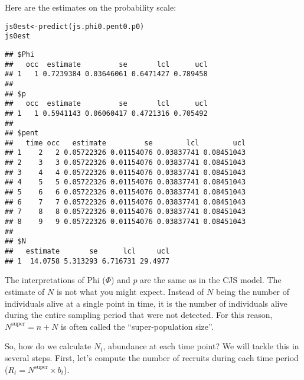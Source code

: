 \documentclass[12pt]{article}\usepackage[]{graphicx}\usepackage[]{color}
\makeatletter
\newcommand{\hlstd}[1]{\textcolor[rgb]{0,0,0}{#1}}%
\newcommand{\hlkwb}[1]{\textcolor[rgb]{0,0.341,0.682}{#1}}%
\newcommand{\hlkwd}[1]{\textcolor[rgb]{0.004,0.004,0.506}{#1}}%
\newenvironment{kframe}{%
 \def\at@end@of@kframe{}%
 \ifinner\ifhmode%
  \def\at@end@of@kframe{\end{minipage}}%
  \begin{minipage}{\columnwidth}%
 \fi\fi%
 \def\FrameCommand##1{\hskip\@totalleftmargin \hskip-\fboxsep
 \colorbox{shadecolor}{##1}\hskip-\fboxsep
     \hskip-\linewidth \hskip-\@totalleftmargin \hskip\columnwidth}%
 \MakeFramed {\advance\hsize-\width
   \@totalleftmargin\z@ \linewidth\hsize
   \@setminipage}}%
 {\par\unskip\endMakeFramed%
 \at@end@of@kframe}
\newenvironment{knitrout}{}{} %
\makeatother
\begin{document}
Here are the estimates on the probability scale:


\begin{knitrout}\small
{}\color{fgcolor}\begin{kframe}
\begin{alltt}
\hlstd{js0est} \hlkwb{<-} \hlkwd{predict}\hlstd{(js.phi0.pent0.p0)}
\hlstd{js0est}
\end{alltt}
\begin{verbatim}
## $Phi
##   occ  estimate         se       lcl      ucl
## 1   1 0.7239384 0.03646061 0.6471427 0.789458
## 
## $p
##   occ  estimate         se       lcl      ucl
## 1   1 0.5941143 0.06060417 0.4721316 0.705492
## 
## $pent
##   time occ   estimate         se        lcl        ucl
## 1    2   2 0.05722326 0.01154076 0.03837741 0.08451043
## 2    3   3 0.05722326 0.01154076 0.03837741 0.08451043
## 3    4   4 0.05722326 0.01154076 0.03837741 0.08451043
## 4    5   5 0.05722326 0.01154076 0.03837741 0.08451043
## 5    6   6 0.05722326 0.01154076 0.03837741 0.08451043
## 6    7   7 0.05722326 0.01154076 0.03837741 0.08451043
## 7    8   8 0.05722326 0.01154076 0.03837741 0.08451043
## 8    9   9 0.05722326 0.01154076 0.03837741 0.08451043
## 
## $N
##   estimate       se      lcl     ucl
## 1  14.0758 5.313293 6.716731 29.4977
\end{verbatim}
\end{kframe}
\end{knitrout}

The interpretations of Phi ($\Phi$) and $p$ are the same as in the CJS
model. The estimate of $N$ is not what you might expect. Instead of
$N$ being the number of individuals alive at a single point in time,
it is the number of individuals alive during the entire sampling
period that were not detected. For this reason,
$N^{\mathrm{super}}=n+N$ is often called the ``super-population size''.

So, how do we calculate $N_t$, abundance at each time point? We will
tackle this in several steps. First, let's compute the number of
recruits during each time period ($R_t=N^{\mathrm{super}}\times b_t$).  
\end{document}
